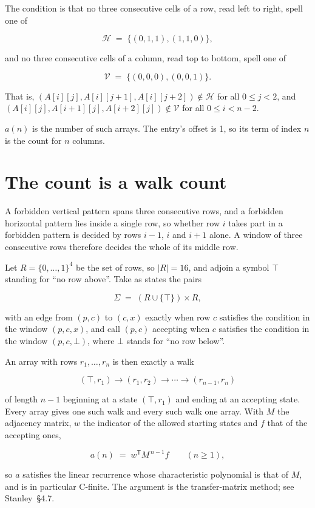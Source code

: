 \documentclass[11pt]{article}
\theoremstyle{definition}
\begin{document}
The condition is that no three consecutive cells of a row, read left to right, spell one of

\[\mathcal{H} \;=\; \{(0,1,1), (1,1,0)\},\]

and no three consecutive cells of a column, read top to bottom, spell one of

\[\mathcal{V} \;=\; \{(0,0,0), (0,0,1)\}.\]

That is, $(A[i][j],A[i][j{+}1],A[i][j{+}2]) \notin \mathcal{H}$ for all $0 \le j < 2$, and $(A[i][j],A[i{+}1][j],A[i{+}2][j]) \notin \mathcal{V}$ for all $0 \le i < n-2$.

$a(n)$ is the number of such arrays. The entry's offset is 1, so its term of index $n$ is the count for $n$ columns.

\section{The count is a walk count}

A forbidden vertical pattern spans three consecutive rows, and a forbidden horizontal pattern lies inside a single row, so whether row $i$ takes part in a forbidden pattern is decided by rows $i-1$, $i$ and $i+1$ alone. A window of three consecutive rows therefore decides the whole of its middle row.

Let $R = \{0,\dots,1\}^{4}$ be the set of rows, so $|R| = 16$, and adjoin a symbol $\top$ standing for ``no row above''. Take as states the pairs

\[\Sigma \;=\; (R \cup \{\top\}) \times R,\]

with an edge from $(p,c)$ to $(c,x)$ exactly when row $c$ satisfies the condition in the window $(p,c,x)$, and call $(p,c)$ accepting when $c$ satisfies the condition in the window $(p,c,\bot)$, where $\bot$ stands for ``no row below''.

An array with rows $r_1,\dots,r_n$ is then exactly a walk

\[(\top,r_1) \to (r_1,r_2) \to \cdots \to (r_{n-1},r_n)\]

of length $n-1$ beginning at a state $(\top,r_1)$ and ending at an accepting state. Every array gives one such walk and every such walk one array. With $M$ the adjacency matrix, $w$ the indicator of the allowed starting states and $f$ that of the accepting ones,

\[a(n) \;=\; w^{\mathsf T} M^{\,n-1} f \qquad (n \ge 1),\]

so $a$ satisfies the linear recurrence whose characteristic polynomial is that of $M$, and is in particular C-finite. The argument is the transfer-matrix method; see Stanley~\S4.7.
\end{document}
